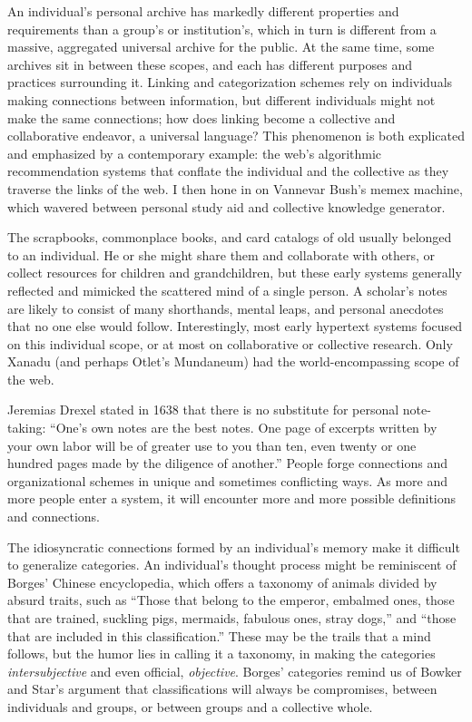 An individual's personal archive has markedly different properties and requirements than a group's or institution's, which in turn is different from a massive, aggregated universal archive for the public. At the same time, some archives sit in between these scopes, and each has different purposes and practices surrounding it. Linking and categorization schemes rely on individuals making connections between information, but different individuals might not make the same connections; how does linking become a collective and collaborative endeavor, a universal language? This phenomenon is both explicated and emphasized by a contemporary example: the web's algorithmic recommendation systems that conflate the individual and the collective as they traverse the links of the web. I then hone in on Vannevar Bush's memex machine, which wavered between personal study aid and collective knowledge generator.

The scrapbooks, commonplace books, and card catalogs of old usually belonged to an individual. He or she might share them and collaborate with others, or collect resources for children and grandchildren, but these early systems generally reflected and mimicked the scattered mind of a single person. A scholar's notes are likely to consist of many shorthands, mental leaps, and personal anecdotes that no one else would follow. Interestingly, most early hypertext systems focused on this individual scope, or at most on collaborative or collective research. Only Xanadu (and perhaps Otlet's Mundaneum) had the world-encompassing scope of the web.

Jeremias Drexel stated in 1638 that there is no substitute for personal note-taking: ``One's own notes are the best notes. One page of excerpts written by your own labor will be of greater use to you than ten, even twenty or one hundred pages made by the diligence of another.''\autocite{blair_note_2004} People forge connections and organizational schemes in unique and sometimes conflicting ways. As more and more people enter a system, it will encounter more and more possible definitions and connections.

The idiosyncratic connections formed by an individual's memory make it difficult to generalize categories. An individual's thought process might be reminiscent of Borges' Chinese encyclopedia, which offers a taxonomy of animals divided by absurd traits, such as ``Those that belong to the emperor, embalmed ones, those that are trained, suckling pigs, mermaids, fabulous ones, stray dogs,'' and ``those that are included in this classification.''\autocite{Borges ``The Analytical Language of John Wilkins''} These may be the trails that a mind follows, but the humor lies in calling it a taxonomy, in making the categories \emph{intersubjective} and even official, \emph{objective}. Borges' categories remind us of Bowker and Star's argument that classifications will always be compromises, between individuals and groups, or between groups and a collective whole.

